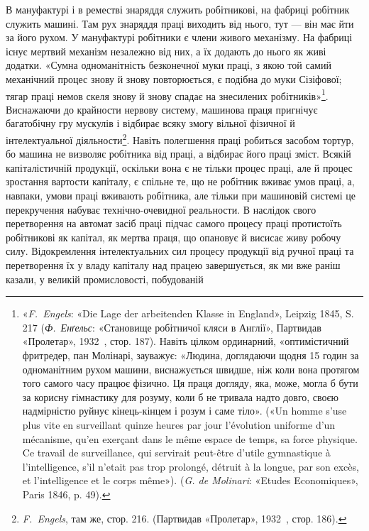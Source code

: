 В мануфактурі і в реместві знаряддя служить робітникові,
на фабриці робітник служить машині. Там рух знаряддя праці
виходить від нього, тут — він має йти за його рухом. У мануфактурі
робітники є члени живого механізму. На фабриці існує
мертвий механізм незалежно від них, а їх додають до нього як
живі додатки. «Сумна одноманітність безконечної муки праці, з
якою той самий механічний процес знову й знову повторюється, є
подібна до муки Сізіфової; тягар праці немов скеля знову й знову
спадає на знесилених робітників»\footnote{
«\emph{F.~Engels}: «Die Lage der arbeitenden Klasse in England», Leipzig
1845, S. 217 (\emph{Ф.~Енґельс}: «Становище робітничої кляси в Англії»,
Партвидав «Пролетар», 1932~, стор. 187). Навіть цілком ординарний,
«оптимістичний фритредер, пан Молінарі, зауважує: «Людина, доглядаючи
щодня 15 годин за одноманітним рухом машини, виснажується
швидше, ніж коли вона протягом того самого часу працює фізично. Ця праця
догляду, яка, може, могла б бути за корисну гімнастику для розуму,
коли б не тривала надто довго, своєю надмірністю руйнує кінець-кінцем
і розум і саме тіло». («Un homme s’use plus vite en surveillant quinze
heures par jour l’évolution uniforme d’un mécanisme, qu’en exerçant dans
le même espace de temps, sa force physique. Ce travail de surveillance,
qui servirait peut-être d’utile gymnastique à l’intelligence, s’il n’etait pas
trop prolongé, détruit à la longue, par son excès, et l’intelligence et le corps
même»). (\emph{G. de Molinari}: «Etudes Economiques», Paris 1846, p. 49).
}. Виснажаючи до крайности
нервову систему, машинова праця пригнічує багатобічну гру
мускулів і відбирає всяку змогу вільної фізичної й інтелектуальної
діяльности\footnote{
\emph{F.~Engels}, там же, стор. 216. (Партвидав «Пролетар», 1932~,
стор. 186).
}. Навіть полегшення праці робиться засобом тортур,
бо машина не визволяє робітника від праці, а відбирає його
праці зміст. Всякій капіталістичній продукції, оскільки вона є
не тільки процес праці, але й процес зростання вартости капіталу,
є спільне те, що не робітник вживає умов праці, а, навпаки,
умови праці вживають робітника, але тільки при машиновій
системі це перекручення набуває технічно-очевидної реальности.
В наслідок свого перетворення на автомат засіб праці підчас
самого процесу праці протистоїть робітникові як капітал,
як мертва праця, що опановує й висисає живу робочу силу. Відокремлення
інтелектуальних сил процесу продукції від ручної
праці та перетворення їх у владу капіталу над працею завершується,
як ми вже раніш казали, у великій промисловості, побудованій

